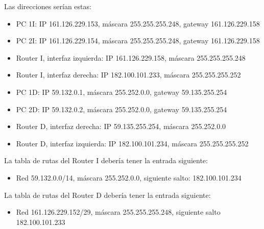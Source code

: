 \documentclass[letterpaper,10pt,spanish]{sphinxmanual}
\begin{document}
\sphinxAtStartPar
Las direcciones serían estas:
\begin{itemize}
\item {} 
\sphinxAtStartPar
PC 1I: IP 161.126.229.153, máscara 255.255.255.248, gateway 161.126.229.158

\item {} 
\sphinxAtStartPar
PC 2I: IP 161.126.229.154, máscara 255.255.255.248, gateway 161.126.229.158

\item {} 
\sphinxAtStartPar
Router I, interfaz izquierda: IP 161.126.229.158, máscara 255.255.255.248

\item {} 
\sphinxAtStartPar
Router I, interfaz derecha: IP 182.100.101.233, máscara 255.255.255.252

\item {} 
\sphinxAtStartPar
PC 1D: IP 59.132.0.1, máscara 255.252.0.0, gateway 59.135.255.254

\item {} 
\sphinxAtStartPar
PC 2D: IP 59.132.0.2, máscara 255.252.0.0, gateway 59.135.255.254

\item {} 
\sphinxAtStartPar
Router D, interfaz derecha: IP 59.135.255.254, máscara 255.252.0.0

\item {} 
\sphinxAtStartPar
Router D, interfaz izquierda: IP 182.100.101.234, máscara 255.255.255.252

\end{itemize}

\sphinxAtStartPar
La tabla de rutas del Router I debería tener la entrada siguiente:
\begin{itemize}
\item {} 
\sphinxAtStartPar
Red 59.132.0.0/14, máscara 255.252.0.0, siguiente salto: 182.100.101.234

\end{itemize}

\sphinxAtStartPar
La tabla de rutas del Router D debería tener la entrada siguiente:
\begin{itemize}
\item {} 
\sphinxAtStartPar
Red 161.126.229.152/29, máscara 255.255.255.248, siguiente salto 182.100.101.233

\end{itemize}
\end{document}
